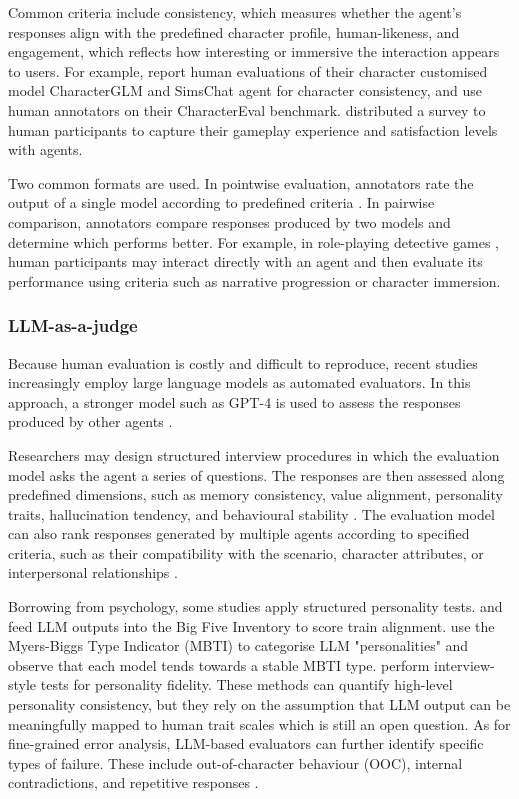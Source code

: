 \documentclass{article}
\begin{document}
Common criteria include consistency, which measures whether the agent’s responses align with the predefined character profile, human-likeness, and engagement, which reflects how interesting or immersive the interaction appears to users. For example, \cite{yang2024crafting, zhou2023characterglm} report human evaluations of their character customised model CharacterGLM and SimsChat agent for character consistency, and \cite{tu2024charactereval} use human annotators on their CharacterEval benchmark. \cite{zhu2024player} distributed a survey to human participants to capture their gameplay experience and satisfaction levels with agents.

Two common formats are used. In pointwise evaluation, annotators rate the output of a single model according to predefined criteria \citep{zhou2023characterglm}. In pairwise comparison, annotators compare responses produced by two models and determine which performs better. For example, in role-playing detective games \citep{zhu2024player}, human participants may interact directly with an agent and then evaluate its performance using criteria such as narrative progression or character immersion.

\subsubsection{LLM-as-a-judge}

Because human evaluation is costly and difficult to reproduce, recent studies increasingly employ large language models as automated evaluators. In this approach, a stronger model such as GPT-4 is used to assess the responses produced by other agents \citep{chen2023hp, chen2024review, shao2023characterllm}.

Researchers may design structured interview procedures in which the evaluation model asks the agent a series of questions. The responses are then assessed along predefined dimensions, such as memory consistency, value alignment, personality traits, hallucination tendency, and behavioural stability \citep{shao2023characterllm, park2023generative}. The evaluation model can also rank responses generated by multiple agents according to specified criteria, such as their compatibility with the scenario, character attributes, or interpersonal relationships \citep{chen2023hp, chen2024review}.

Borrowing from psychology, some studies apply structured personality tests. \cite{jiang2024personallm} and \cite{sorokovikova2024llms} feed LLM outputs into the Big Five Inventory to score train alignment. \cite{pan2023llms} use the Myers-Biggs Type Indicator (MBTI) to categorise LLM "personalities" and observe that each model tends towards a stable MBTI type. \cite{wang2024incharacter} perform interview-style tests for personality fidelity. These methods can quantify high-level personality consistency, but they rely on the assumption that LLM output can be meaningfully mapped to human trait scales which is still an open question. As for fine-grained error analysis, LLM-based evaluators can further identify specific types of failure. These include out-of-character behaviour (OOC), internal contradictions, and repetitive responses \citep{zhou2023characterglm}.
\end{document}
